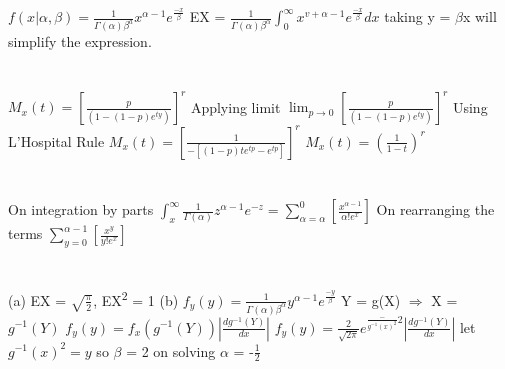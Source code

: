 \documentclass{report}
\begin{document}
\section{}
$f(x|\alpha, \beta) = \frac{1}{\Gamma(\alpha)\beta^{a}}x^{\alpha - 1}e^{\frac{-x}{\beta}}$
\newline
EX = $\frac{1}{\Gamma(\alpha)\textit{$\beta$}^{\alpha}}\int_{0}^{\infty}x^{v + \alpha - 1}e^{\frac{-x}{\beta}}dx$ taking y = $\beta$x will simplify the expression.
\newline

\section{} 
$M_x(t) = \left[\frac{p}{(1 - (1 - p)e^{ty})}\right]^r$
\newline
Applying limit
\newline
$\lim_{p \rightarrow 0}\left[\frac{p}{(1 - (1 - p)e^{ty})}\right]^r$
\newline
Using L'Hospital Rule
\newline
$M_x(t) = \left[\frac{1}{-[(1-p)te^{tp} - e^{tp}]}\right]^r$
\newline
$M_x(t) = \left(\frac{1}{1 - t}\right)^r$
\newline

\section{}
On integration by parts 
\newline
$\int_{x}^{\infty}\frac{1}{\Gamma(\alpha)}z^{\alpha - 1}e^{-z} = \sum_{\alpha=\alpha}^{0}\left[\frac{x^{\alpha - 1}}{\alpha!e^{x}}\right]$
\newline
On rearranging the terms
\newline
$\sum_{y=0}^{\alpha - 1}\left[\frac{x^{y}}{y!e^{x}}\right]$
\newline

\section{}
(a) EX = $\sqrt{\frac{\pi}{2}}$, EX\textsuperscript{2} = 1
\newline
(b) $f_y(y) = \frac{1}{\Gamma(\alpha)\beta^\alpha}y^{\alpha - 1}e^{\frac{-y}{\beta}}$
\newline
Y = g(X) $\Rightarrow$ X = $g^{-1}(Y)$
\newline
$f_y(y) = f_x(g^{-1}(Y))\left|\frac{dg^{-1}(Y)}{dx}\right|$
\newline
$f_y(y) = \frac{2}{\sqrt{2\pi}}e^{\frac-{g^{-1}(x)^2}{2}}\left|\frac{dg^{-1}(Y)}{dx}\right|$
let $g^{-1}(x)^2 = y$
so $\beta$ = 2
on solving $\alpha$ = -$\frac{1}{2}$
\newline
\end{document}
